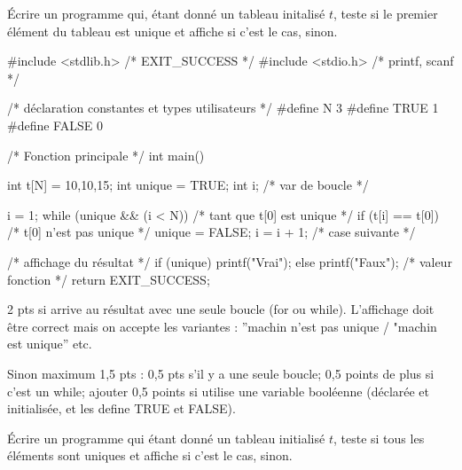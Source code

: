 \question Écrire un programme qui, étant donné un tableau initalisé $t$,
  teste si le premier élément du tableau est unique et affiche
   si c'est le cas,  sinon.
  \begin{correction}


\begin{listing}{1}
#include <stdlib.h> /* EXIT_SUCCESS */
#include <stdio.h> /* printf, scanf */

/* déclaration constantes et types utilisateurs */
#define N 3
#define TRUE 1
#define FALSE 0

/* Fonction principale */
int main()
{
  int t[N] = {10,10,15};
  int unique = TRUE;
  int i; /* var de boucle */

  i = 1;
  while (unique && (i < N)) /* tant que t[0] est unique */
  {
    if (t[i] == t[0]) /* t[0] n'est pas unique */
    {
      unique = FALSE;
    }
    i = i + 1; /* case suivante */
  }

  /* affichage du résultat */
  if (unique)
  {
    printf("Vrai\n");
  }
  else
  {
    printf("Faux\n");
  }
  /* valeur fonction */
  return EXIT_SUCCESS;
}
\end{listing}

    \begin{baremeenv}
    2 pts si arrive au résultat avec une seule boucle (for ou
    while). L'affichage doit être correct mais on accepte les
    variantes : ''machin n'est
    pas unique / "machin est unique'' etc.

    Sinon maximum 1,5 pts : 0,5 pts s'il y a une seule boucle; 0,5
    points de plus si c'est un while; ajouter 0,5 points si utilise une
    variable booléenne (déclarée et initialisée, et les define TRUE
    et FALSE).      
    \end{baremeenv}
  \end{correction}


\question Écrire un programme qui étant donné un tableau initialisé $t$, teste
  si tous les éléments sont uniques et affiche  si c'est le
  cas,  sinon.

